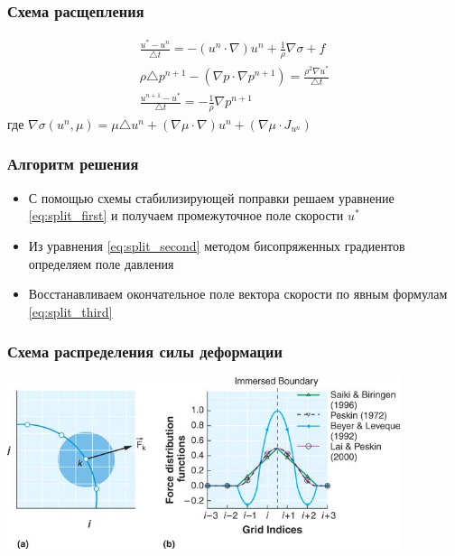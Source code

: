 \documentclass[14pt]{beamer}
\begin{document}
\begin{frame}
\frametitle{Схема расщепления}
\begin{gather}
    \label{eq:split_first}
    \frac{u^* - u^n}{\triangle t} = - (u^n \cdot \nabla) u^n + \frac{1}{\rho} \nabla \sigma + f\\
    \label{eq:split_second}
    \rho \triangle p^{n+1} - (\nabla p \cdot \nabla p^{n+1}) = \frac{\rho^2 \nabla u^*}{\triangle t}\\
    \label{eq:split_third}
    \frac{u^{n+1} - u^*}{\triangle t} = - \frac{1}{\rho} \nabla p^{n+1}
\end{gather}
где $\nabla \sigma (u^n, \mu) = \mu \triangle u^n + (\nabla \mu \cdot \nabla) u^n + (\nabla \mu \cdot J_{u^n}) $
\end{frame}

\begin{frame}
\frametitle{Алгоритм решения}
    \begin{itemize}
        \item \alert<+>{С помощью схемы стабилизирующей поправки решаем уравнение \eqref{eq:split_first} и получаем промежуточное поле скорости $u^*$}
        \item \alert<+>{Из уравнения \eqref{eq:split_second} методом бисопряженных градиентов определяем поле давления}
        \item \alert<+>{Восстанавливаем окончательное поле вектора скорости по явным формулам \eqref{eq:split_third}}
    \end{itemize}
\end{frame}

\begin{frame}
\frametitle{Схема распределения силы деформации}
    \begin{center}
        \includegraphics[width=11.5cm]{delta_function.png}
    \end{center}
\end{frame}
\end{document}
